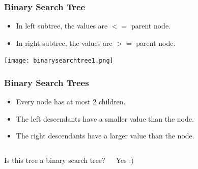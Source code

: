 \begin{frame}
	\frametitle{Binary Search Tree}
		\begin{itemize}
		\item In left subtree, the values are $<=$ parent node.
		\item In right subtree, the values are $>=$ parent node.
		\end{itemize}
		
\begin{center}
\texttt{[image: binarysearchtree1.png]}
\end{center}

\end{frame}



\begin{frame}
	\frametitle{Binary Search Trees}
	
		\begin{itemize}
			\item Every node has at most 2 children.
				
			\item The left descendants have a smaller value than the node.
			\item The right descendants have a larger value than the node.
		\end{itemize}
	
	\begin{columns}[T]


			Is this tree a binary search tree?
		
			Yes :)	
	\end{columns}
\end{frame}

